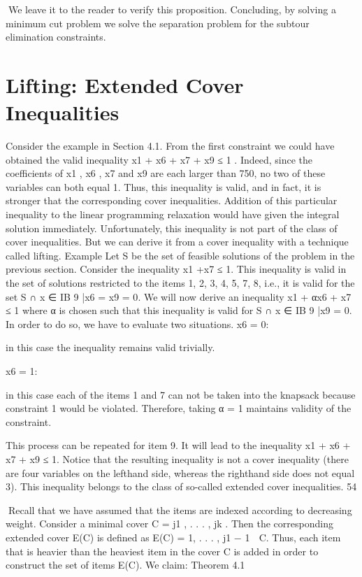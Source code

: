 We leave it to the reader to verify this proposition. Concluding, by solving a minimum cut problem we
solve the separation problem for the subtour elimination constraints.

\section{Lifting: Extended Cover Inequalities}

Consider the example in Section 4.1. From the first constraint we could have obtained the valid inequality
x1 + x6 + x7 + x9 ≤ 1
. Indeed, since the coefficients of x1 , x6 , x7 and x9 are each larger than 750, no two of these variables
can both equal 1. Thus, this inequality is valid, and in fact, it is stronger that the corresponding cover
inequalities. Addition of this particular inequality to the linear programming relaxation would have
given the integral solution immediately. Unfortunately, this inequality is not part of the class of cover
inequalities. But we can derive it from a cover inequality with a technique called lifting.
Example Let S be the set of feasible solutions of the problem in the previous section. Consider the inequality x1 +x7 ≤ 1. This inequality is valid in the set of solutions restricted to the items {1, 2, 3, 4, 5, 7, 8},
i.e., it is valid for the set S ∩ {x ∈ IB 9 |x6 = x9 = 0}. We will now derive an inequality
x1 + αx6 + x7 ≤ 1
where α is chosen such that this inequality is valid for S ∩ {x ∈ IB 9 |x9 = 0}. In order to do so, we have
to evaluate two situations.
x6 = 0:

in this case the inequality remains valid trivially.

x6 = 1:

in this case each of the items 1 and 7 can not be taken into the knapsack because constraint 1
would be violated. Therefore, taking α = 1 maintains validity of the constraint.

This process can be repeated for item 9. It will lead to the inequality
x1 + x6 + x7 + x9 ≤ 1.
Notice that the resulting inequality is not a cover inequality (there are four variables on the lefthand side,
whereas the righthand side does not equal 3). This inequality belongs to the class of so-called extended
cover inequalities.
54

Recall that we have assumed that the items are indexed according to decreasing weight. Consider a
minimal cover C = {j1 , . . . , jk }. Then the corresponding extended cover E(C) is defined as
E(C) = {1, . . . , j1 − 1} ∪ C.
Thus, each item that is heavier than the heaviest item in the cover C is added in order to construct the
set of items E(C). We claim:
Theorem 4.1

